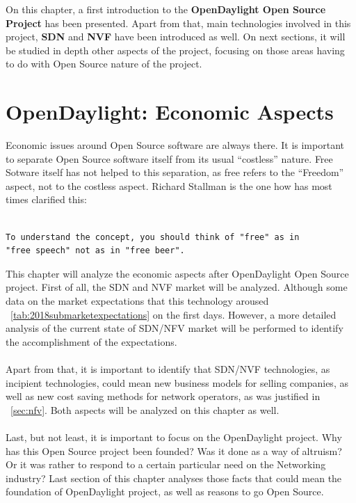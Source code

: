 \documentclass[a4paper, 12pt]{book}
\begin{document}
On this chapter, a first introduction to the \textbf{OpenDaylight Open Source Project} has been presented. Apart from that, main technologies involved in this project, \textbf{SDN} and \textbf{NVF} have been introduced as well. On next sections, it will be studied in depth other aspects of the project, focusing on those areas having to do with Open Source nature of the project.

\chapter{OpenDaylight: Economic Aspects}
\label{chap:odleconomic}

Economic issues around Open Source software are always there. It is important to separate Open Source software itself from its usual ``costless'' nature. Free Sotware itself has not helped to this separation, as free refers to the ``Freedom'' aspect, not to the costless aspect. Richard Stallman is the one how has most times clarified this:
\begin{verbatim}

To understand the concept, you should think of "free" as in
"free speech" not as in "free beer".

\end{verbatim}
This chapter will analyze the economic aspects after OpenDaylight Open Source project. First of all, the SDN and NVF market will be analyzed. Although some data on the market expectations that this technology aroused ~\ref{tab:2018submarketexpectations} on the first days. However, a more detailed analysis of the current state of SDN/NFV market will be performed to identify the accomplishment of the expectations.\\
\\
Apart from that, it is important to identify that SDN/NVF technologies, as incipient technologies, could mean new business models for selling companies, as well as new cost saving methods for network operators, as was justified in ~\ref{sec:nfv}. Both aspects will be analyzed on this chapter as well.\\
\\
Last, but not least, it is important to focus on the OpenDaylight project. Why has this Open Source project been founded? Was it done as a way of altruism? Or it was rather to respond to a certain particular need on the Networking industry? Last section of this chapter analyses those facts that could mean the foundation of OpenDaylight project, as well as reasons to go Open Source.
\end{document}
